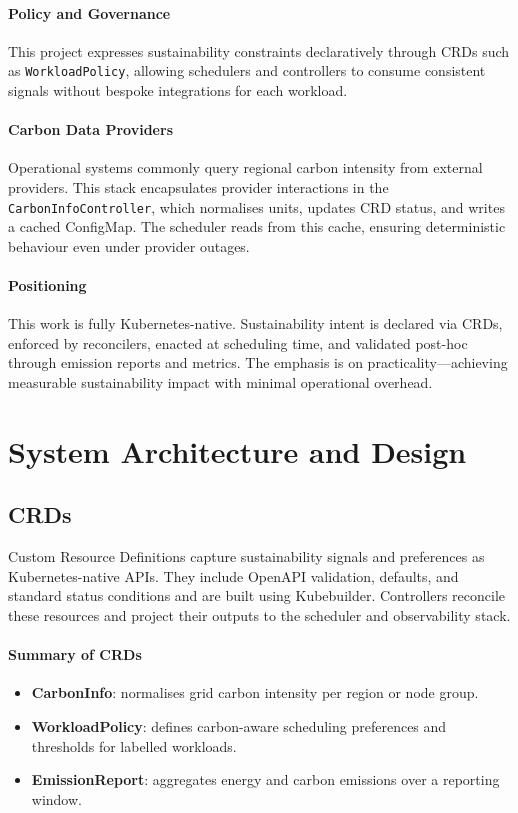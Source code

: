 \documentclass{article}
\begin{document}
\paragraph{Policy and Governance}
This project expresses sustainability constraints declaratively 
through CRDs such as \texttt{WorkloadPolicy}, allowing schedulers and 
controllers to consume consistent signals without bespoke integrations 
for each workload.

\paragraph{Carbon Data Providers}
Operational systems commonly query regional carbon intensity from external providers. This stack encapsulates provider
interactions in the \texttt{CarbonInfoController}, which normalises units, updates CRD status, and writes a cached
ConfigMap. The scheduler reads from this cache, ensuring deterministic behaviour even under provider outages.

\paragraph{Positioning}
This work is fully Kubernetes-native. Sustainability intent is declared via
CRDs, enforced by reconcilers, enacted at scheduling time, and validated post-hoc through emission reports and metrics.
The emphasis is on practicality—achieving measurable sustainability impact with minimal operational overhead.

\section{System Architecture and Design}

\subsection{CRDs}

Custom Resource Definitions capture sustainability signals and preferences as Kubernetes-native APIs.
They include OpenAPI validation, defaults, and standard status conditions and are built using Kubebuilder. 
Controllers reconcile these resources and project their outputs to the
scheduler and observability stack.

\paragraph{Summary of CRDs}
\begin{itemize}
  \item \textbf{CarbonInfo}: normalises grid carbon intensity per region or node group.
  \item \textbf{WorkloadPolicy}: defines carbon-aware scheduling preferences and thresholds for labelled workloads.
  \item \textbf{EmissionReport}: aggregates energy and carbon emissions over a reporting window.
\end{itemize}
\end{document}
